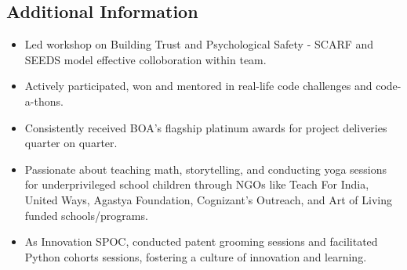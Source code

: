 \subsection*{\color{CarianBlue} \Large Additional Information \crulefill{1pt}}

\begin{itemize}[leftmargin=1em,noitemsep]
    \item Led workshop on Building Trust and Psychological Safety - SCARF and SEEDS model effective colloboration within team.
    \item Actively participated, won and mentored in real-life code challenges and code-a-thons.
    \item Consistently received BOA's flagship platinum awards for project deliveries quarter on quarter.
    \item Passionate about teaching math, storytelling, and conducting yoga sessions for underprivileged school children through NGOs like Teach For India, United Ways, Agastya Foundation, Cognizant's Outreach, and Art of Living funded schools/programs.
    \item As Innovation SPOC, conducted patent grooming sessions and facilitated Python cohorts sessions, fostering a culture of innovation and learning.
\end{itemize}


